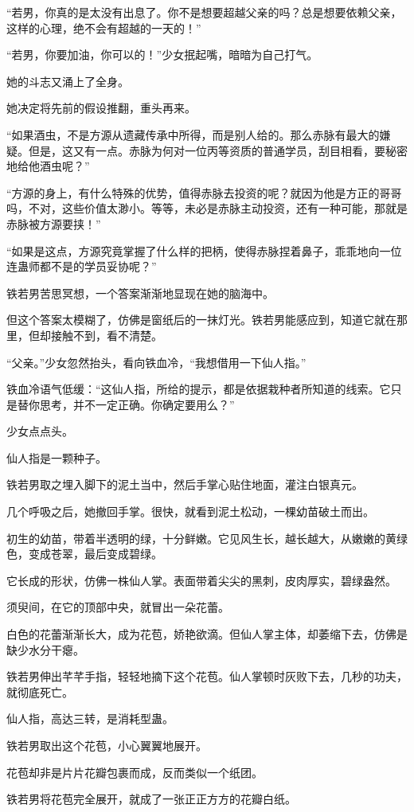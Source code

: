 \begin{this_body}
“若男，你真的是太没有出息了。你不是想要超越父亲的吗？总是想要依赖父亲，这样的心理，绝不会有超越的一天的！”

“若男，你要加油，你可以的！”少女抿起嘴，暗暗为自己打气。

她的斗志又涌上了全身。

她决定将先前的假设推翻，重头再来。

“如果酒虫，不是方源从遗藏传承中所得，而是别人给的。那么赤脉有最大的嫌疑。但是，这又有一点。赤脉为何对一位丙等资质的普通学员，刮目相看，要秘密地给他酒虫呢？”

“方源的身上，有什么特殊的优势，值得赤脉去投资的呢？就因为他是方正的哥哥吗，不对，这些价值太渺小。等等，未必是赤脉主动投资，还有一种可能，那就是赤脉被方源要挟！”

“如果是这点，方源究竟掌握了什么样的把柄，使得赤脉捏着鼻子，乖乖地向一位连蛊师都不是的学员妥协呢？”

铁若男苦思冥想，一个答案渐渐地显现在她的脑海中。

但这个答案太模糊了，仿佛是窗纸后的一抹灯光。铁若男能感应到，知道它就在那里，但却接触不到，看不清楚。

“父亲。”少女忽然抬头，看向铁血冷，“我想借用一下仙人指。”

铁血冷语气低缓：“这仙人指，所给的提示，都是依据栽种者所知道的线索。它只是替你思考，并不一定正确。你确定要用么？”

少女点点头。

仙人指是一颗种子。

铁若男取之埋入脚下的泥土当中，然后手掌心贴住地面，灌注白银真元。

几个呼吸之后，她撤回手掌。很快，就看到泥土松动，一棵幼苗破土而出。

初生的幼苗，带着半透明的绿，十分鲜嫩。它见风生长，越长越大，从嫩嫩的黄绿色，变成苍翠，最后变成碧绿。

它长成的形状，仿佛一株仙人掌。表面带着尖尖的黑刺，皮肉厚实，碧绿盎然。

须臾间，在它的顶部中央，就冒出一朵花蕾。

白色的花蕾渐渐长大，成为花苞，娇艳欲滴。但仙人掌主体，却萎缩下去，仿佛是缺少水分干瘪。

铁若男伸出芊芊手指，轻轻地摘下这个花苞。仙人掌顿时灰败下去，几秒的功夫，就彻底死亡。

仙人指，高达三转，是消耗型蛊。

铁若男取出这个花苞，小心翼翼地展开。

花苞却非是片片花瓣包裹而成，反而类似一个纸团。

铁若男将花苞完全展开，就成了一张正正方方的花瓣白纸。


\end{this_body}
